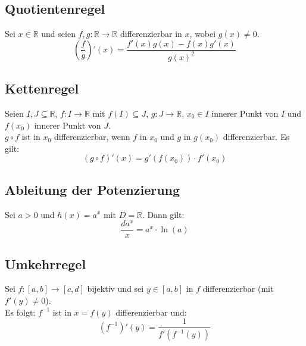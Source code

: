 \documentclass[halfparscip]{scrartcl}
\newcounter{subsection2}
\begin{document}
\subsection{Quotientenregel}
Sei $x \in \mathbb{R}$ und seien $f, g: \mathbb{R} \rightarrow \mathbb{R}$ differenzierbar in $x$, wobei $g(x) \neq 0$.\\
\begin{equation*}
	\left(\frac{f}{g}\right)'(x) = \frac{f'(x)g(x) - f(x)g'(x)}{g(x)^2}
\end{equation*}

\subsection{Kettenregel}
Seien $I, J \subseteq \mathbb{R}$, $f: I \rightarrow \mathbb{R}$ mit $f(I) \subseteq J$, $g: J \rightarrow \mathbb{R}$, $x_0 \in I$ innerer Punkt von $I$ und $f(x_0)$ innerer Punkt von $J$.\\
$g \circ f$ ist in $x_0$ differenzierbar, wenn $f$ in $x_0$ und $g$ in $g(x_0)$ differenzierbar. Es gilt:
\begin{equation*}
	(g \circ f)'(x) = g'(f(x_0)) \cdot f'(x_0)
\end{equation*}

\subsection{Ableitung der Potenzierung}
Sei $a > 0$ und $h(x) = a^x$ mit $D = \mathbb{R}$. Dann gilt:
\begin{equation*}
	\frac{da^x}{x}=a^x\cdot \ln(a)
\end{equation*}

\addtocounter{subsection}{2}
\subsection{Umkehrregel}
Sei $f: [a, b] \rightarrow [c, d]$ bijektiv und sei $y \in [a, b]$ in $f$ differenzierbar (mit $f'(y) \neq 0$).\\
Es folgt: $f^{-1}$ ist in $x = f(y)$ differenzierbar und:
\begin{equation*}
	\left(f^{-1}\right)'(y) = \frac{1}{f'\left(f^{-1}(y)\right)}
\end{equation*}

\addtocounter{subsection}{3}
\end{document}
